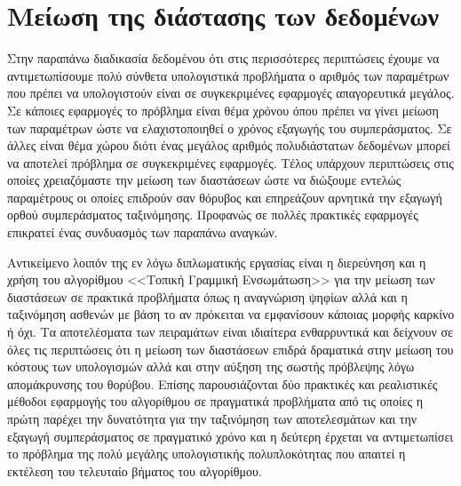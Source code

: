 \section{Μείωση της διάστασης των δεδομένων}
\par
Στην παραπάνω διαδικασία δεδομένου ότι στις περισσότερες περιπτώσεις έχουμε να αντιμετωπίσουμε πολύ σύνθετα υπολογιστικά προβλήματα ο αριθμός των παραμέτρων που πρέπει να υπολογιστούν είναι σε συγκεκριμένες εφαρμογές απαγορευτικά μεγάλος. Σε κάποιες εφαρμογές το πρόβλημα είναι θέμα χρόνου όπου πρέπει να γίνει μείωση των παραμέτρων ώστε να ελαχιστοποιηθεί ο χρόνος εξαγωγής του συμπεράσματος. Σε άλλες είναι θέμα χώρου διότι ένας μεγάλος αριθμός πολυδιάστατων δεδομένων μπορεί να αποτελεί πρόβλημα σε συγκεκριμένες εφαρμογές. Τέλος υπάρχουν περιπτώσεις στις οποίες χρειαζόμαστε την μείωση των διαστάσεων ώστε να διώξουμε εντελώς παραμέτρους οι οποίες επιδρούν σαν θόρυβος και επηρεάζουν αρνητικά την εξαγωγή ορθού συμπεράσματος ταξινόμησης. Προφανώς σε πολλές πρακτικές εφαρμογές επικρατεί ένας συνδυασμός των παραπάνω αναγκών.
\par
Αντικείμενο λοιπόν της εν λόγω διπλωματικής εργασίας είναι η διερεύνηση και η χρήση του αλγορίθμου <<Τοπική Γραμμική Ενσωμάτωση>>\cite{lle} για την μείωση των διαστάσεων σε πρακτικά προβλήματα όπως η αναγνώριση ψηφίων αλλά και η ταξινόμηση ασθενών με βάση το αν πρόκειται να εμφανίσουν κάποιας μορφής καρκίνο ή όχι. Τα αποτελέσματα των πειραμάτων είναι ιδιαίτερα ενθαρρυντικά και δείχνουν σε όλες τις περιπτώσεις ότι η μείωση των διαστάσεων επιδρά δραματικά στην μείωση του κόστους των υπολογισμών αλλά και στην αύξηση της σωστής πρόβλεψης λόγω απομάκρυνσης του θορύβου. Επίσης παρουσιάζονται δύο πρακτικές και ρεαλιστικές μέθοδοι εφαρμογής του αλγορίθμου σε πραγματικά προβλήματα από τις οποίες η πρώτη παρέχει την δυνατότητα για την ταξινόμηση των αποτελεσμάτων και την εξαγωγή συμπεράσματος σε πραγματικό χρόνο και η δεύτερη έρχεται να αντιμετωπίσει το πρόβλημα της πολύ μεγάλης υπολογιστικής πολυπλοκότητας που απαιτεί η εκτέλεση του τελευταίο βήματος του αλγορίθμου.

